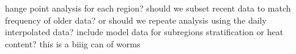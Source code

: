 \markdownRendererDocumentBegin
\markdownRendererUlBeginTight
\markdownRendererUlItem hange point analysis for each region?\markdownRendererUlItemEnd 
\markdownRendererUlItem should we subset recent data to match frequency of older data? or should we repeate analysis using the daily interpolated data?\markdownRendererUlItemEnd 
\markdownRendererUlItem include model data for subregions stratification or heat content? this is a biiig can of worms\markdownRendererUlItemEnd 
\markdownRendererUlEndTight \markdownRendererDocumentEnd